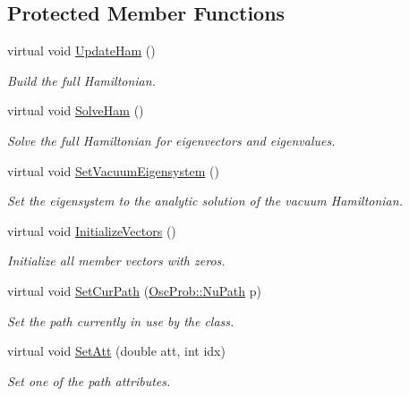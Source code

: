 \subsection*{Protected Member Functions}
\begin{DoxyCompactItemize}
\item 
virtual void \hyperlink{classOscProb_1_1PMNS__NSI_ab5c4f4644fbedb8835f6336c553805ce}{Update\+Ham} ()
\begin{DoxyCompactList}\small\item\em Build the full Hamiltonian. \end{DoxyCompactList}\item 
virtual void \hyperlink{classOscProb_1_1PMNS__Fast_a8a0828401591e88c60e0051fbfe02d5e}{Solve\+Ham} ()
\begin{DoxyCompactList}\small\item\em Solve the full Hamiltonian for eigenvectors and eigenvalues. \end{DoxyCompactList}\item 
virtual void \hyperlink{classOscProb_1_1PMNS__Fast_a76dd5a761df8689c502b28ad0391f9e2}{Set\+Vacuum\+Eigensystem} ()
\begin{DoxyCompactList}\small\item\em Set the eigensystem to the analytic solution of the vacuum Hamiltonian. \end{DoxyCompactList}\item 
virtual void \hyperlink{classOscProb_1_1PMNS__Base_adf23b569112f9f9e0e592f01d79a5f3d}{Initialize\+Vectors} ()
\begin{DoxyCompactList}\small\item\em Initialize all member vectors with zeros. \end{DoxyCompactList}\item 
virtual void \hyperlink{classOscProb_1_1PMNS__Base_a986e6ebef09a7e2eb7fee16a4c2c834d}{Set\+Cur\+Path} (\hyperlink{structOscProb_1_1NuPath}{Osc\+Prob\+::\+Nu\+Path} p)
\begin{DoxyCompactList}\small\item\em Set the path currently in use by the class. \end{DoxyCompactList}\item 
virtual void \hyperlink{classOscProb_1_1PMNS__Base_aba565962a440d14bee7a2a96d2eca2c5}{Set\+Att} (double att, int idx)
\begin{DoxyCompactList}\small\item\em Set one of the path attributes. \end{DoxyCompactList}\item 

\end{DoxyCompactItemize}
